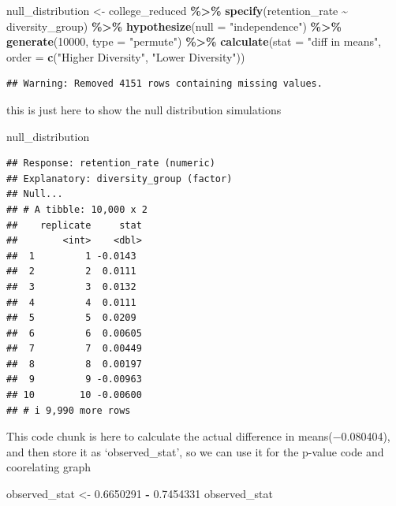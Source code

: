 \documentclass[
]{article}
\newenvironment{Shaded}{\begin{snugshade}}{\end{snugshade}}
\newcommand{\AttributeTok}[1]{\textcolor[rgb]{0.13,0.29,0.53}{#1}}
\newcommand{\DecValTok}[1]{\textcolor[rgb]{0.00,0.00,0.81}{#1}}
\newcommand{\FloatTok}[1]{\textcolor[rgb]{0.00,0.00,0.81}{#1}}
\newcommand{\FunctionTok}[1]{\textcolor[rgb]{0.13,0.29,0.53}{\textbf{#1}}}
\newcommand{\NormalTok}[1]{#1}
\newcommand{\OtherTok}[1]{\textcolor[rgb]{0.56,0.35,0.01}{#1}}
\newcommand{\SpecialCharTok}[1]{\textcolor[rgb]{0.81,0.36,0.00}{\textbf{#1}}}
\newcommand{\StringTok}[1]{\textcolor[rgb]{0.31,0.60,0.02}{#1}}
\begin{document}
\begin{Shaded}
\begin{Highlighting}[]
\NormalTok{null\_distribution }\OtherTok{\textless{}{-}}\NormalTok{ college\_reduced }\SpecialCharTok{\%\textgreater{}\%}
  \FunctionTok{specify}\NormalTok{(retention\_rate }\SpecialCharTok{\textasciitilde{}}\NormalTok{ diversity\_group) }\SpecialCharTok{\%\textgreater{}\%}
  \FunctionTok{hypothesize}\NormalTok{(}\AttributeTok{null =} \StringTok{"independence"}\NormalTok{) }\SpecialCharTok{\%\textgreater{}\%}
  \FunctionTok{generate}\NormalTok{(}\DecValTok{10000}\NormalTok{, }\AttributeTok{type =} \StringTok{"permute"}\NormalTok{) }\SpecialCharTok{\%\textgreater{}\%}
  \FunctionTok{calculate}\NormalTok{(}\AttributeTok{stat =} \StringTok{"diff in means"}\NormalTok{, }\AttributeTok{order =} \FunctionTok{c}\NormalTok{(}\StringTok{"Higher Diversity"}\NormalTok{, }\StringTok{"Lower Diversity"}\NormalTok{))}
\end{Highlighting}
\end{Shaded}

\begin{verbatim}
## Warning: Removed 4151 rows containing missing values.
\end{verbatim}

this is just here to show the null distribution simulations

\begin{Shaded}
\begin{Highlighting}[]
\NormalTok{null\_distribution}
\end{Highlighting}
\end{Shaded}

\begin{verbatim}
## Response: retention_rate (numeric)
## Explanatory: diversity_group (factor)
## Null...
## # A tibble: 10,000 x 2
##    replicate     stat
##        <int>    <dbl>
##  1         1 -0.0143 
##  2         2  0.0111 
##  3         3  0.0132 
##  4         4  0.0111 
##  5         5  0.0209 
##  6         6  0.00605
##  7         7  0.00449
##  8         8  0.00197
##  9         9 -0.00963
## 10        10 -0.00600
## # i 9,990 more rows
\end{verbatim}

This code chunk is here to calculate the actual difference in
means(−0.080404), and then store it as `observed\_stat', so we can use
it for the p-value code and coorelating graph

\begin{Shaded}
\begin{Highlighting}[]
\NormalTok{  observed\_stat }\OtherTok{\textless{}{-}} \FloatTok{0.6650291} \SpecialCharTok{{-}} \FloatTok{0.7454331}
\NormalTok{  observed\_stat}
\end{Highlighting}
\end{Shaded}
\end{document}
